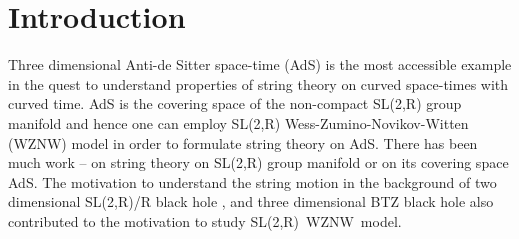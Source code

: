 \documentclass[a4paper,12pt]{article}
\begin{document}
\newpage {}

\section{Introduction}

Three dimensional Anti-de Sitter space-time (AdS\coordHE{}) is the most
accessible example in the quest to understand properties of string theory on
curved space-times with curved time. AdS\coordHE{} is the covering space of the
non-compact SL(2,R) group manifold and hence one can employ SL(2,R)
Wess-Zumino-Novikov-Witten (WZNW) model in order to formulate string theory
on AdS\coordHE{}. There has been much work \cite{BRFW}--\cite{MO-1} on string
theory on SL(2,R) group manifold or on its covering space AdS\coordHE{}. The
motivation to understand the string motion in the background of two
dimensional SL(2,R)/R black hole \cite{BN},\cite{witten} and three
dimensional BTZ black hole \cite{BTZ} also contributed to the motivation to
study SL(2,R)\ WZNW\ model.
\end{document}
